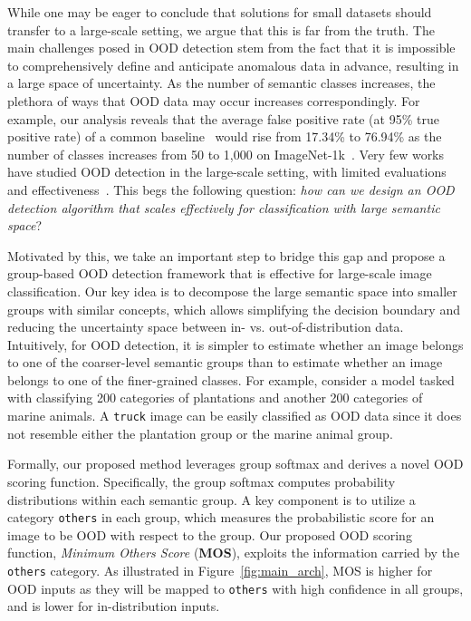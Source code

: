 \documentclass[final]{cvpr}
\begin{document}
While one may be eager to conclude that solutions for small datasets should transfer to a large-scale setting, we argue that this is far from the truth. The main challenges posed in OOD detection stem from the fact that it is impossible to comprehensively define and anticipate anomalous data in advance, resulting in a large space of uncertainty. As the number of semantic classes increases, the plethora of ways that OOD data may occur increases correspondingly. For example, our analysis reveals that the average false positive rate (at 95\% true positive rate) of a common baseline~\cite{hendrycks2016baseline} would rise from 17.34\% to 76.94\% as the number of classes increases from 50 to 1,000 on ImageNet-1k~\cite{deng2009imagenet}. Very few works have studied OOD detection in the large-scale setting, with limited evaluations and effectiveness~\cite{roady2019outofdistribution,hendrycks2019benchmark}. This begs the following question: \emph{how can we design an OOD detection algorithm that scales effectively for classification with large semantic space}?



Motivated by this, we take an important step to bridge this gap and propose a group-based OOD detection framework that is effective for large-scale image classification. Our key idea is to decompose the large semantic space into smaller groups with similar concepts, which allows simplifying the decision boundary and reducing the uncertainty space between in- vs. out-of-distribution data. Intuitively, for OOD detection, it is simpler to estimate whether an image belongs to one of the coarser-level semantic groups than to estimate whether an image belongs to one of the finer-grained classes. For example, consider a  model tasked with classifying 200 categories of plantations and another 200 categories of marine animals. A \texttt{truck} image can be easily classified as OOD data since it does not resemble either the plantation group or the marine animal group.

Formally, our proposed method leverages group softmax and derives a novel OOD scoring function. Specifically, the group softmax computes probability distributions within each semantic group. A key component is to utilize a category \texttt{others} in each group, which measures the probabilistic score for an image to be OOD with respect to the group. Our proposed  OOD scoring function, \emph{Minimum Others Score} (\textbf{MOS}), exploits the information carried by the \texttt{others} category. As illustrated in Figure~\ref{fig:main_arch}, MOS is higher for OOD inputs as they will be mapped to \texttt{others} with high confidence in all groups, and is lower for in-distribution inputs.
\end{document}
